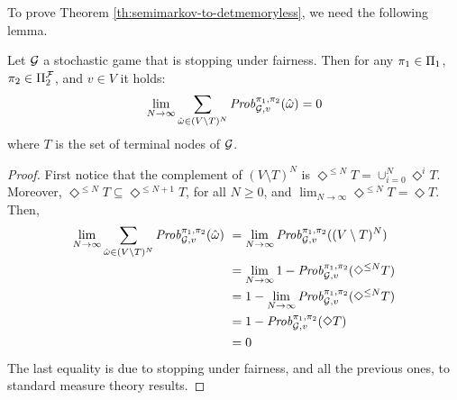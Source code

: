 
To prove Theorem \ref{th:semimarkov-to-detmemoryless},  we need the following lemma.



\begin{lemma}\label{lemma:sum-of-nonterminal-is-zero}
  Let $\mathcal{G}$ a stochastic game that is stopping under fairness.
  Then for any $\pi_{1} \in \Pi_{1}$,
  $\pi_{2} \in \Pi^{\mathcal{F}}_{2}$, and $v \in V$ it holds:
  \[
  \lim_{N \to \infty} \sum_{\hat{\omega} \in (V \setminus T)^N} \mathit{Prob}^{\pi_{1}, \pi_{2}}_{\mathcal{G},v}(\hat{\omega}) = 0
  \]
  where $T$ is the set of terminal nodes of $\mathcal{G}$.
\end{lemma}
%
\begin{proof}
  First notice that the complement of $(V \setminus T)^N$ is
  $\Diamond^{\leq N} T = \cup^N_{i=0} \Diamond^i T$.
  Moreover, $\Diamond^{\leq N} T \subseteq \Diamond^{\leq N+1} T$, for all $N\geq 0$,
  and $\lim_{N \to \infty} \Diamond^{\leq N} T = \Diamond T$.
  Then,
  \begin{align*}
    \lim_{N \to \infty} \sum_{\hat{\omega} \in (V \setminus T)^N} \mathit{Prob}^{\pi_{1}, \pi_{2}}_{\mathcal{G},v}(\hat{\omega}) \
    & = \lim_{N \to \infty} \mathit{Prob}^{\pi_{1}, \pi_{2}}_{\mathcal{G},v}((V \setminus T)^N) \\
    & = \lim_{N \to \infty} 1 - \mathit{Prob}^{\pi_{1}, \pi_{2}}_{\mathcal{G},v}(\Diamond^{\leq N} T ) \\
    & = 1 - \lim_{N \to \infty} \mathit{Prob}^{\pi_{1}, \pi_{2}}_{\mathcal{G},v}(\Diamond^{\leq N} T ) \\
    & = 1 - \mathit{Prob}^{\pi_{1}, \pi_{2}}_{\mathcal{G},v}(\Diamond T ) \\
    & = 0
  \end{align*}
  The last equality is due to stopping under fairness, and all the
  previous ones, to standard measure theory results.

\end{proof}
